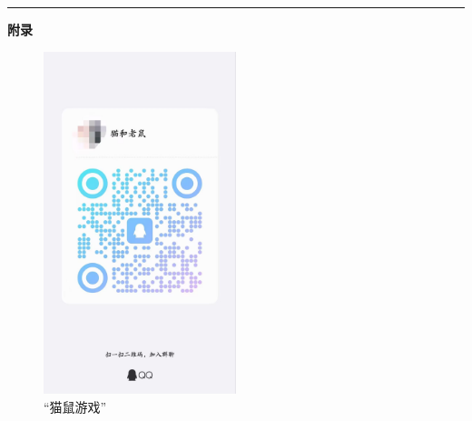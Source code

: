 \documentclass[letterpaper, 12pt]{article}
\begin{document}
\hrule
\vspace{4mm}
\centerline{\huge\textbf{附录}}
\begin{figure}[htbp]
    \centering
    \begin{minipage}[b]{0.32\textwidth}
        \centering
         \includegraphics[width=0.5\textwidth]{猫和老鼠.jpg}
        \caption{“猫鼠游戏”}
    \end{minipage}
\end{figure}
\end{document}
